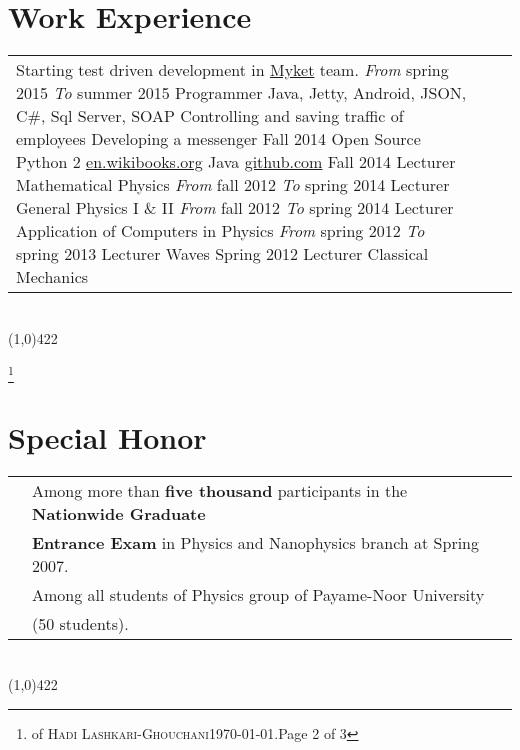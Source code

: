 \documentclass[10pt]{article}
\newcommand{\maxpages}{3}
\newcommand{\maxpages}{3}
\newcommand\HRule{\hspace*{.8cm}\line(1,0){422}\\}
\newenvironment{Record}[1]
{
    \vspace{-0.5cm}
    \section*{#1}
        \vspace{0.1cm}
        \begin{tabular}
}
{
        \end{tabular}\\
        \HRule
}
\newcommand{\FootNote}[1]{\let\thefootnote\relax\footnote{\smallsnellfont{\textbf{\textit{Curriculum Vitae}}} of \textsc{Hadi Lashkari-Ghouchani}\qquad\today.\qquad Page #1 of \maxpages}}
\begin{document}
\begin{Record}{Work Experience}{l l l}
        {Starting test driven development in \href{http://myket.ir}{Myket} team.}%
    \WorkExperience{\href{http://sohasys.ir}{Soha Company}}
        {\scriptsize\textit{From} spring 2015}
        {\scriptsize\textit{To} summer 2015}
        {Programmer}
        {Java, Jetty, Android, JSON, C\#, Sql Server, SOAP}
        {Controlling and saving traffic of employees}
        {Developing a messenger}
        {}{}%
    \WorkExperience{Persian Calendar}
        {Fall 2014}{}
        {Open Source}
        {Python 2}
        {\href{http://en.wikibooks.org/wiki/Persian_Calendar}{en.wikibooks.org}}
        {Java}
        {\href{https://github.com/hadilq/java-persian-calendar}{github.com}}{}%
    \WorkExperience{\href{http://en.pnu.ac.ir/Portal/Home}{Payame-Noor University}}
        {Fall 2014}{}
        {Lecturer}
        {Mathematical Physics}
        {}{}{}{}%
    \WorkExperience{\href{http://www.sadjad.ac.ir/MainEn.aspx}{Sadjad University}}
        {\scriptsize\textit{From} fall 2012}
        {\scriptsize\textit{To} spring 2014}
        {Lecturer}
        {General Physics I \& II}
        {}{}{}{}%
    \WorkExperience{\href{http://en.pnu.ac.ir/Portal/Home}{Payame-Noor University}}
        {\scriptsize\textit{From} fall 2012}
        {\scriptsize\textit{To} spring 2014}
        {Lecturer}
        {Application of Computers in Physics}
        {}{}{}{}%
    \WorkExperience{\href{http://en.pnu.ac.ir/Portal/Home}{Payame-Noor University}}
        {\scriptsize\textit{From} spring 2012}
        {\scriptsize\textit{To} spring 2013}
        {Lecturer}
        {Waves}
        {}{}{}{}%
    \WorkExperience{\href{http://en.pnu.ac.ir/Portal/Home}{Payame-Noor University}}
        {Spring 2012}{}
        {Lecturer}
        {Classical Mechanics}
        {}{}{}{}%
\end{Record}


\FootNote{2}

\newcommand{\SpecialHonor}[3]{
    \textsl{ #1}&#2\\
    &#3\\
}
\begin{Record}{Special Honor}{l l}
    \SpecialHonor{\copperplatefont{\textbf{44th} rank}}
        {\scriptsize Among more than \textbf{five thousand} participants in the \textbf{Nationwide Graduate}}
        {\scriptsize \textbf{Entrance Exam} in Physics and Nanophysics branch at Spring 2007.}%
    \SpecialHonor{\copperplatefont{First rank}}
        {\scriptsize Among all students of Physics group of Payame-Noor University}
        {\scriptsize (50 students).}%
\end{Record}
\end{document}
